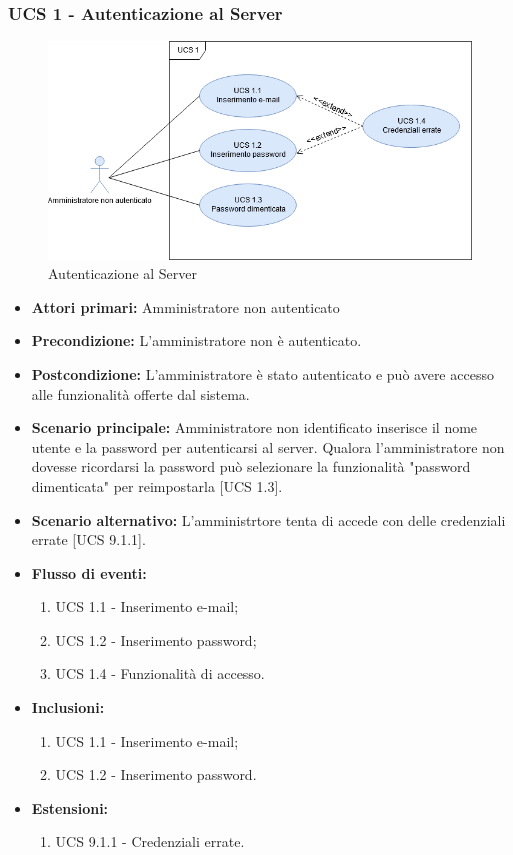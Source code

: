 \newpage

\subsubsection{UCS 1 - Autenticazione al Server}

\begin{figure}[h]
    \centering
    \includegraphics[scale=0.6]{sezioni/UseCase/Immagini/UCS1.png}
    \caption{Autenticazione al Server}
\end{figure}

\begin{itemize}
\item \textbf{Attori primari:} Amministratore non autenticato
\item \textbf{Precondizione:} L'amministratore non è autenticato.
\item \textbf{Postcondizione:} L'amministratore è stato autenticato e può avere accesso alle funzionalità offerte dal sistema.
\item \textbf{Scenario principale:} Amministratore non identificato inserisce il nome utente e la password per autenticarsi al server. Qualora l'amministratore non dovesse ricordarsi la password può selezionare la funzionalità "password dimenticata" per reimpostarla [UCS 1.3].
\item \textbf{Scenario alternativo:} L'amministrtore tenta di accede con delle credenziali errate [UCS 9.1.1].
\item \textbf{Flusso di eventi:}
    \begin{enumerate}
        \item UCS 1.1 - Inserimento e-mail;
        \item UCS 1.2 - Inserimento password;
        \item UCS 1.4 - Funzionalità di accesso.
    \end{enumerate}
    \item \textbf{Inclusioni:}
	\begin{enumerate}		
		\item UCS 1.1 - Inserimento e-mail;
		\item UCS 1.2 - Inserimento password.
	\end{enumerate}
    \item \textbf{Estensioni:}
    \begin{enumerate}
		\item UCS 9.1.1 - Credenziali errate.
	\end{enumerate}
\end{itemize}

